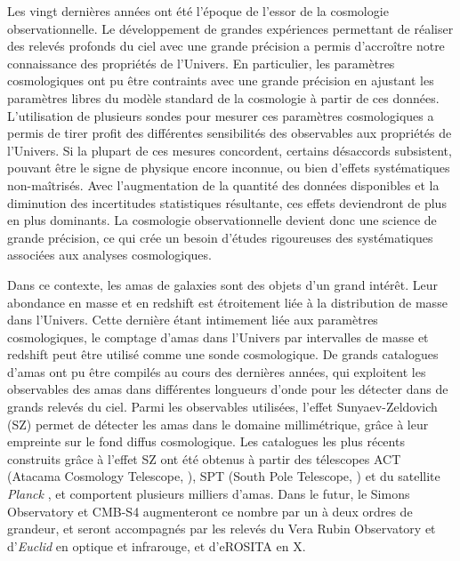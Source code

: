 Les vingt dernières années ont été l'époque de l'essor de la cosmologie observationnelle.
Le développement de grandes expériences permettant de réaliser des relevés profonds du ciel avec une grande précision a permis d'accroître notre connaissance des propriétés de l'Univers.
En particulier, les paramètres cosmologiques ont pu être contraints avec une grande précision en ajustant les paramètres libres du modèle standard de la cosmologie à partir de ces données.
L'utilisation de plusieurs sondes pour mesurer ces paramètres cosmologiques a permis de tirer profit des différentes sensibilités des observables aux propriétés de l'Univers.
Si la plupart de ces mesures concordent, certains désaccords subsistent, pouvant être le signe de physique encore inconnue, ou bien d'effets systématiques non-maîtrisés.
Avec l'augmentation de la quantité des données disponibles et la diminution des incertitudes statistiques résultante, ces effets deviendront de plus en plus dominants.
La cosmologie observationnelle devient donc une science de grande précision, ce qui crée un besoin d'études rigoureuses des systématiques associées aux analyses cosmologiques.

Dans ce contexte, les amas de galaxies sont des objets d'un grand intérêt.
Leur abondance en masse et en redshift est étroitement liée à la distribution de masse dans l'Univers.
Cette dernière étant intimement liée aux paramètres cosmologiques, le comptage d'amas dans l'Univers par intervalles de masse et redshift peut être utilisé comme une sonde cosmologique.
De grands catalogues d'amas ont pu être compilés au cours des dernières années, qui exploitent les observables des amas dans différentes longueurs d'onde pour les détecter dans de grands relevés du ciel.
Parmi les observables utilisées, l'effet Sunyaev-Zeldovich (SZ) permet de détecter les amas dans le domaine millimétrique, grâce à leur empreinte sur le fond diffus cosmologique.
Les catalogues les plus récents construits grâce à l'effet SZ ont été obtenus à partir des télescopes ACT (Atacama Cosmology Telescope, \cite{hilton_atacama_2021}), SPT (South Pole Telescope, \cite{bleem_galaxy_2015,bleem_sptpol_2020}) et du satellite \textit{Planck} \cite{planck_collaboration_planck_2016-3}, et comportent plusieurs milliers d'amas.
Dans le futur, le Simons Observatory \cite{ade_simons_2019} et CMB-S4 \cite{abazajian_cmb-s4_2016} augmenteront ce nombre par un à deux ordres de grandeur, et seront accompagnés par les relevés du Vera Rubin Observatory \cite{lsst_dark_energy_science_collaboration_large_2012} et d'\textit{Euclid} \cite{sartoris_next_2016} en optique et infrarouge, et d'eROSITA \cite{pillepich_forecasts_2018} en X.

